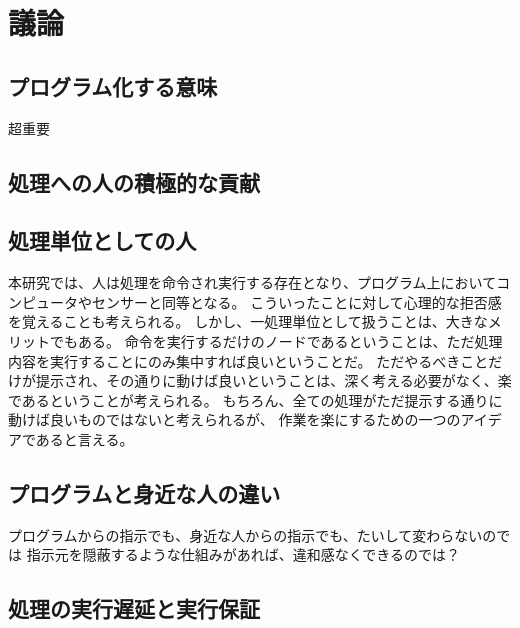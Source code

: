 \chapter{議論}\label{chap:discussion}

\section{プログラム化する意味}\label{ux30d7ux30edux30b0ux30e9ux30e0ux5316ux3059ux308bux610fux5473}

超重要

\section{処理への人の積極的な貢献}\label{ux51e6ux7406ux3078ux306eux4ebaux306eux7a4dux6975ux7684ux306aux8ca2ux732e}

\section{処理単位としての人}\label{ux51e6ux7406ux5358ux4f4dux3068ux3057ux3066ux306eux4eba}

本研究では、人は処理を命令され実行する存在となり、プログラム上においてコンピュータやセンサーと同等となる。
こういったことに対して心理的な拒否感を覚えることも考えられる。
しかし、一処理単位として扱うことは、大きなメリットでもある。
命令を実行するだけのノードであるということは、ただ処理内容を実行することにのみ集中すれば良いということだ。
ただやるべきことだけが提示され、その通りに動けば良いということは、深く考える必要がなく、楽であるということが考えられる。
もちろん、全ての処理がただ提示する通りに動けば良いものではないと考えられるが、
作業を楽にするための一つのアイデアであると言える。

\section{プログラムと身近な人の違い}\label{ux30d7ux30edux30b0ux30e9ux30e0ux3068ux8eabux8fd1ux306aux4ebaux306eux9055ux3044}

プログラムからの指示でも、身近な人からの指示でも、たいして変わらないのでは
指示元を隠蔽するような仕組みがあれば、違和感なくできるのでは？

\section{処理の実行遅延と実行保証}\label{ux51e6ux7406ux306eux5b9fux884cux9045ux5ef6ux3068ux5b9fux884cux4fddux8a3c}

